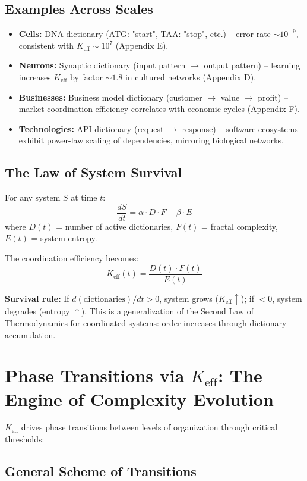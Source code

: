 \documentclass[12pt,a4paper]{article}
\newcommand{\eff}{\mathrm{eff}}
\newcommand{\Ke}{K_{\eff}}
\begin{document}
	\subsection{Examples Across Scales}
	
	\begin{itemize}
		\item \textbf{Cells:} DNA dictionary (ATG: "start", TAA: "stop", etc.) – error rate $\sim 10^{-9}$, consistent with $\Ke \sim 10^7$ (Appendix E).
		\item \textbf{Neurons:} Synaptic dictionary (input pattern $\to$ output pattern) – learning increases $\Ke$ by factor $\sim 1.8$ in cultured networks (Appendix D).
		\item \textbf{Businesses:} Business model dictionary (customer $\to$ value $\to$ profit) – market coordination efficiency correlates with economic cycles (Appendix F).
		\item \textbf{Technologies:} API dictionary (request $\to$ response) – software ecosystems exhibit power-law scaling of dependencies, mirroring biological networks.
	\end{itemize}
	
	\subsection{The Law of System Survival}
	
	For any system $S$ at time $t$:
	\[
	\frac{dS}{dt} = \alpha \cdot D \cdot F - \beta \cdot E
	\]
	where $D(t)$ = number of active dictionaries, $F(t)$ = fractal complexity, $E(t)$ = system entropy.
	
	The coordination efficiency becomes:
	\[
	\Ke(t) = \frac{D(t) \cdot F(t)}{E(t)}
	\]
	
	\textbf{Survival rule:} If $d(\text{dictionaries})/dt > 0$, system grows ($\Ke \uparrow$); if $< 0$, system degrades (entropy $\uparrow$). This is a generalization of the Second Law of Thermodynamics for coordinated systems: order increases through dictionary accumulation.
	
	\section{Phase Transitions via $\Ke$: The Engine of Complexity Evolution}
	
	$\Ke$ drives phase transitions between levels of organization through critical thresholds:
	
	\subsection{General Scheme of Transitions}
	
\end{document}
